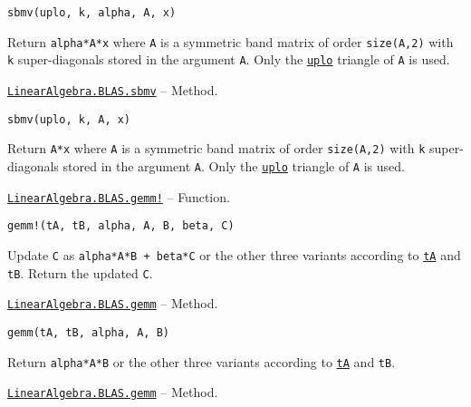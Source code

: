 \begin{adjustwidth}{2em}{0pt}


\begin{verbatim}
sbmv(uplo, k, alpha, A, x)
\end{verbatim}

Return \texttt{alpha*A*x} where \texttt{A} is a symmetric band matrix of order \texttt{size(A,2)} with \texttt{k} super-diagonals stored in the argument \texttt{A}. Only the \hyperlink{13880289478825450693}{\texttt{uplo}} triangle of \texttt{A} is used.



\end{adjustwidth}
\hypertarget{7377039972156415076}{}
\hyperlink{7377039972156415076}{\texttt{LinearAlgebra.BLAS.sbmv}}  -- {Method.}

\begin{adjustwidth}{2em}{0pt}


\begin{verbatim}
sbmv(uplo, k, A, x)
\end{verbatim}

Return \texttt{A*x} where \texttt{A} is a symmetric band matrix of order \texttt{size(A,2)} with \texttt{k} super-diagonals stored in the argument \texttt{A}. Only the \hyperlink{13880289478825450693}{\texttt{uplo}} triangle of \texttt{A} is used.



\end{adjustwidth}
\hypertarget{8173170876588438683}{}
\hyperlink{8173170876588438683}{\texttt{LinearAlgebra.BLAS.gemm!}}  -- {Function.}

\begin{adjustwidth}{2em}{0pt}


\begin{verbatim}
gemm!(tA, tB, alpha, A, B, beta, C)
\end{verbatim}

Update \texttt{C} as \texttt{alpha*A*B + beta*C} or the other three variants according to \hyperlink{15951037910221396131}{\texttt{tA}} and \texttt{tB}. Return the updated \texttt{C}.



\end{adjustwidth}
\hypertarget{8242351663919248561}{}
\hyperlink{8242351663919248561}{\texttt{LinearAlgebra.BLAS.gemm}}  -- {Method.}

\begin{adjustwidth}{2em}{0pt}


\begin{verbatim}
gemm(tA, tB, alpha, A, B)
\end{verbatim}

Return \texttt{alpha*A*B} or the other three variants according to \hyperlink{15951037910221396131}{\texttt{tA}} and \texttt{tB}.



\end{adjustwidth}
\hypertarget{11803563367212870441}{}
\hyperlink{11803563367212870441}{\texttt{LinearAlgebra.BLAS.gemm}}  -- {Method.}

